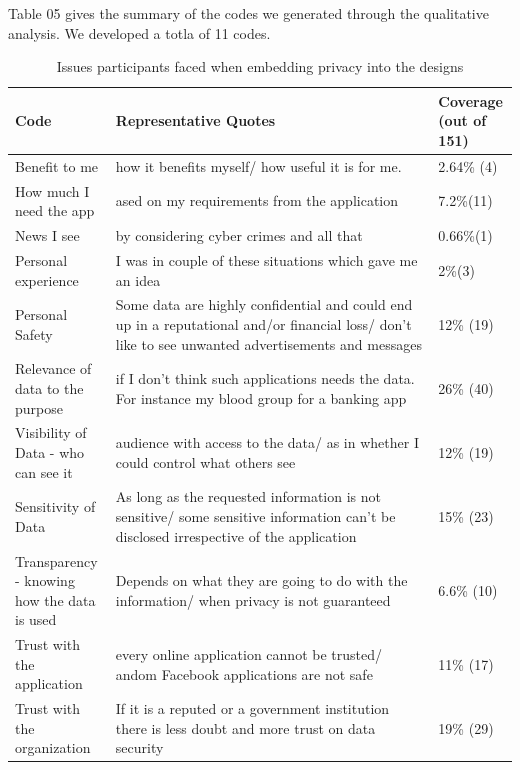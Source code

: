 \documentclass[conference]{IEEEtran}
\begin{document}
Table 05 gives the summary of the codes we generated through the qualitative analysis. We developed a totla of 11 codes.

\begin{center}
\begin{table}[htbp]
\caption{Issues participants faced when embedding privacy into the designs}
\begin{center}
\begin{adjustbox}{width=1\textwidth}
\begin{tabular}{|p{0.20\linewidth}|p{0.64\linewidth}|p{0.16\linewidth}|}
\hline
Code &  Representative Quotes & Coverage (out of 151)\\
\hline
Benefit to me &how it benefits myself/ how useful it is for me. & 2.64\% (4)\\
\hline
How much I need the app &  ased on my requirements from the application & 7.2\%(11)\\
\hline
News I see  & by considering cyber crimes and all that & 0.66\%(1) \\
\hline
Personal experience &  I was in couple of these situations which gave me an idea & 2\%(3) \\
\hline
Personal Safety & Some data are highly confidential and could end up in a reputational and/or financial loss/  don't like to see unwanted advertisements and messages & 12\% (19)\\ 
\hline
Relevance of data to the purpose &if I don't think such applications needs the data. For instance my blood group for a banking app
 & 26\% (40)\\ 
\hline
Visibility of Data - who can see it & audience with access to the data/ as in whether I could control what others see & 12\% (19)\\ 
\hline
Sensitivity of Data & As long as the requested information is not sensitive/  some sensitive information can't be disclosed irrespective of the application
 & 15\% (23)\\ 
\hline
Transparency - knowing how the data is used & Depends on what they are going to do with the information/ when privacy is not guaranteed & 6.6\% (10)\\ 
\hline
Trust with the application & every online application cannot be trusted/ andom Facebook applications are not safe & 11\% (17)\\ 
\hline
Trust with the organization & If it is a reputed or a government institution there is less doubt and more trust on data security
 & 19\% (29)\\ 
\hline
\end{tabular}
\end{adjustbox}
\end{center}
\end{table}
\end{center}
\end{document}
